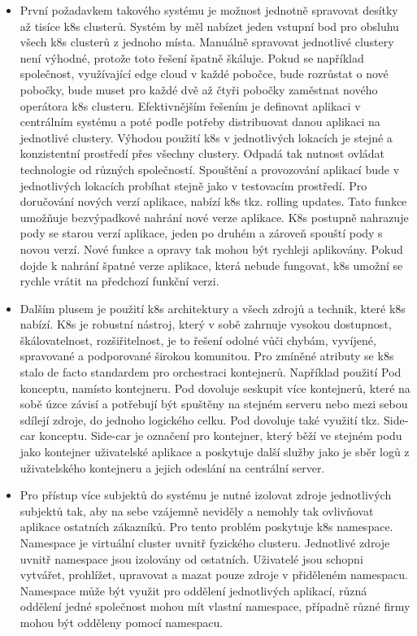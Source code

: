 \begin{itemize}
\item První požadavkem takového systému je možnost jednotně spravovat desítky až tisíce k8s clusterů. Systém by měl nabízet jeden vstupní bod pro obsluhu všech k8s clusterů z jednoho místa.  Manuálně spravovat jednotlivé clustery není \linebreak výhodné, protože toto řešení špatně škáluje. Pokud se například společnost, \linebreak využívající edge cloud v každé pobočce, bude rozrůstat o nové pobočky, bude muset pro každé dvě až čtyři pobočky zaměstnat nového operátora k8s clusteru. Efektivnějším řešením je definovat aplikaci v centrálním systému a poté podle potřeby distribuovat danou aplikaci na jednotlivé clustery. Výhodou použití k8s v jednotlivých lokacích je stejné a konzistentní prostředí přes všechny clustery. Odpadá tak nutnost ovládat technologie od různých společností. Spouštění a provozování aplikací bude v jednotlivých lokacích probíhat stejně jako v testovacím prostředí. Pro doručování nových verzí aplikace, nabízí k8s tkz. rolling updates. Tato funkce umožňuje bezvýpadkové nahrání nové verze aplikace. K8s postupně nahrazuje pody se starou verzí aplikace, jeden po druhém a zároveň spouští pody s novou verzí. Nové funkce a opravy tak mohou být rychleji aplikovány. Pokud dojde k nahrání špatné verze aplikace, která nebude fungovat, k8s umožní se rychle vrátit na předchozí funkční verzi. 
\item     Dalším plusem je použití k8s architektury a všech zdrojů a technik, které k8s nabízí. K8s je robustní nástroj, který v sobě zahrnuje vysokou dostupnost, škálovatelnost, rozšiřitelnost, je to řešení odolné vůči chybám, vyvíjené, spravované a podporované širokou komunitou. Pro zmíněné atributy se k8s stalo de facto standardem pro orchestraci kontejnerů. Například použití Pod konceptu, namísto kontejneru. Pod dovoluje seskupit více kontejnerů, které na sobě úzce závisí a potřebují být spuštěny na stejném serveru nebo mezi sebou sdílejí zdroje, do jednoho logického celku. Pod dovoluje také využití tkz. Side-car konceptu. Side-car je označení pro kontejner, který běží ve stejném podu jako kontejner uživatelské aplikace a poskytuje další služby jako je sběr logů z uživatelského kontejneru a jejich odeslání na centrální server. 
\item Pro přístup více subjektů do systému je nutné izolovat zdroje jednotlivých subjektů tak, aby na sebe vzájemně neviděly a nemohly tak ovlivňovat aplikace ostatních zákazníků. Pro tento problém poskytuje k8s namespace. Namespace je virtuální cluster uvnitř fyzického clusteru. Jednotlivé zdroje uvnitř namespace jsou izolovány od ostatních. Uživatelé jsou schopni vytvářet, prohlížet, upravovat a mazat pouze zdroje v přiděleném namespacu. Namespace může být využit pro oddělení jednotlivých aplikací, různá oddělení jedné společnost mohou mít vlastní namespace, případně různé firmy mohou být odděleny pomocí namespacu. 

\end{itemize}
